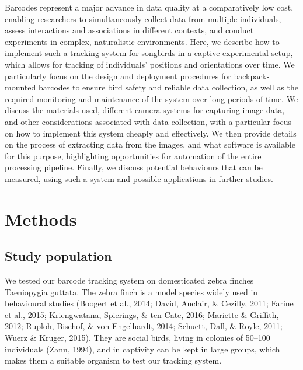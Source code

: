 \documentclass[11pt,a4paper,oneside]{book}
\begin{document}
\begin{doublespace}
    Barcodes represent a major advance in data quality at a comparatively low cost, enabling researchers to simultaneously collect data from multiple individuals, assess interactions and associations in different contexts, and conduct experiments in complex, naturalistic environments. Here, we describe how to implement such a tracking system for songbirds in a captive experimental setup, which allows for tracking of individuals’ positions and orientations over time. We particularly focus on the design and deployment procedures for backpack‐mounted barcodes to ensure bird safety and reliable data collection, as well as the required monitoring and maintenance of the system over long periods of time. We discuss the materials used, different camera systems for capturing image data, and other considerations associated with data collection, with a particular focus on how to implement this system cheaply and effectively. We then provide details on the process of extracting data from the images, and what software is available for this purpose, highlighting opportunities for automation of the entire processing pipeline. Finally, we discuss potential behaviours that can be measured, using such a system and possible applications in further studies.

\section{Methods}
\subsection{Study population}
We tested our barcode tracking system on domesticated zebra finches Taeniopygia guttata. The zebra finch is a model species widely used in behavioural studies (Boogert et al., 2014; David, Auclair, \& Cezilly, 2011; Farine et al., 2015; Kriengwatana, Spierings, \& ten Cate, 2016; Mariette & Griffith, 2012; Ruploh, Bischof, \& von Engelhardt, 2014; Schuett, Dall, \& Royle, 2011; Wuerz & Kruger, 2015). They are social birds, living in colonies of 50–100 individuals (Zann, 1994), and in captivity can be kept in large groups, which makes them a suitable organism to test our tracking system.


\end{doublespace}
\end{document}
